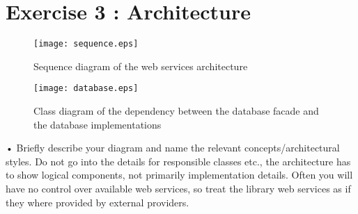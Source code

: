\section{Exercise 3 : Architecture}

    \begin{figure}[p]
      \texttt{[image: sequence.eps]}
      \caption{\label{fig:before}Sequence diagram of the web services architecture}
    \end{figure}

    \begin{figure}[p]
      \texttt{[image: database.eps]}
      \caption{\label{fig:before}Class diagram of the dependency between the database facade and the database implementations}
    \end{figure}

    • Briefly describe your diagram and name the relevant concepts/architectural styles.
    Do not go into the details for responsible classes etc., the architecture has to show
    logical components, not primarily implementation details. Often you will have no
    control over available web services, so treat the library web services as if they where
    provided by external providers.
